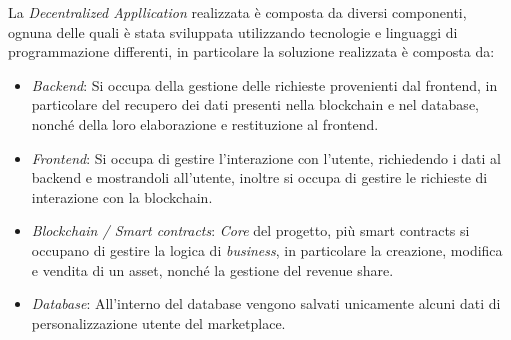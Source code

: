La \textit{Decentralized Appllication} realizzata è composta da diversi componenti, ognuna delle quali è stata sviluppata utilizzando tecnologie e linguaggi di programmazione differenti, in particolare la soluzione realizzata è composta da:

\begin{itemize}
    \item \textit{Backend}: Si occupa della gestione delle richieste provenienti dal frontend, in particolare del recupero dei dati presenti nella blockchain e nel database, nonché della loro elaborazione e restituzione al frontend.
    \item \textit{Frontend}: Si occupa di gestire l'interazione con l'utente, richiedendo i dati al backend e mostrandoli all'utente, inoltre si occupa di gestire le richieste di interazione con la blockchain.
    \item \textit{Blockchain / Smart contracts}: \textit{Core} del progetto, più smart contracts si occupano di gestire la logica di \textit{business}, in particolare la creazione, modifica e vendita di un asset, nonché la gestione del revenue share.
    \item \textit{Database}: All'interno del database vengono salvati unicamente alcuni dati di personalizzazione utente del marketplace.
\end{itemize}



\newpage







\newpage




